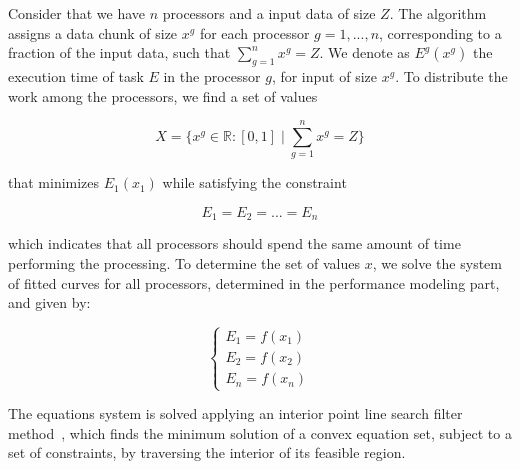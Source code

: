 \documentclass[journal]{IEEEtran}
\begin{document}
Consider that we have $n$ processors and a input data of size $Z$. The algorithm assigns
a data chunk of size $x^g$ for each processor $g=1,...,n$, corresponding to a
fraction of the input data, such that $\sum_{g=1}^n x^g = Z$. We denote as
$E^g(x^g)$ the execution time of task $E$ in the processor $g$, for input of
size $x^g$. To distribute the work among the processors, we find a set of values
	
\begin{equation}
	X = \{ x^g \in \mathbb{R}:[0,1] \mid \sum_{g=1}^n x^g = Z \}
	\label{eq: totalResultado}
\end{equation}

that minimizes $E_1(x_1)$ while satisfying the constraint

\begin{equation}
	E_{1} = E_{2} = ...= E_{n}
	\label{eq: Restricao}
\end{equation}

which indicates that all processors should spend the same amount of time
performing the processing. To determine the set of values $x$, we solve the
system of fitted curves for all processors, determined in the performance
modeling part, and given by:

\begin{equation}
	\left\lbrace
	\begin{array}{ll}
		\displaystyle E_{1} = f(x_{1})  \\
		\displaystyle E_{2} = f(x_{2})   \\
		\displaystyle E_{n} = f(x_{n}) 
		\label{eq: system}
	\end{array}
	\right.
\end{equation}

The equations system is solved applying an interior point line search filter
method~\cite{point}, which finds the minimum solution of a convex equation set,
subject to a set of constraints, by traversing the interior of its
feasible region.



\end{document}
